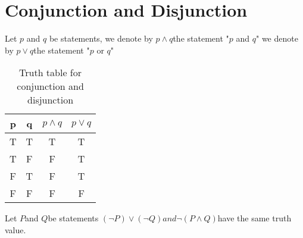 \documentclass{book}
\begin{document}
\section{Conjunction and Disjunction}
\begin{definitionenv}
    Let $p$ and $q$ be statements,
    \newline
    we denote by $p\wedge q $the statement "$p$ and $q$"
    \newline
    we denote by $p\vee q $the statement "$p$ or $q$"
    
\end{definitionenv}

\begin{table}
    \begin{center}
\begin{tabular}{c|c|c|c}
    p & q & $p\wedge q$ & $p\vee q$ \\
    \hline
    T & T & T & T \\
    T & F & F & T \\
    F & T & F & T \\
    F & F & F & F \\    

\end{tabular}
\caption{Truth table for conjunction and disjunction} 
\end{center}
\end{table}

\begin{propositionenv}
    Let $P$and $Q$be statements $(\neg P)\vee (\neg Q)and \neg(P\wedge Q)$have the same truth value.
\end{propositionenv}
\end{document}
